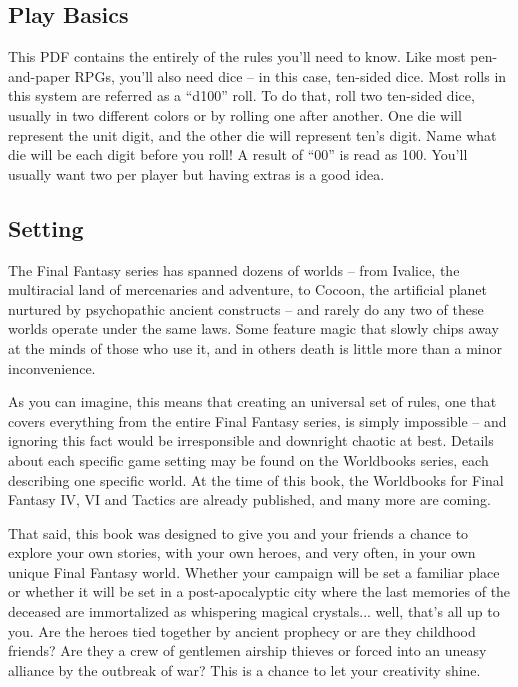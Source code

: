\begin{multicols}{2}

\section{Play Basics}
This PDF contains the entirely of the rules
you'll need to know. Like most pen-and-paper
RPGs, you'll also need dice – in this case, ten-sided
dice. Most rolls in this system are referred as a
“d100” roll. To do that, roll two ten-sided dice,
usually in two different colors or by rolling one
after another. One die will represent the unit digit,
and the other die will represent ten's digit. Name
what die will be each digit before you roll! A result
of “00” is read as 100. You’ll usually want two per
player but having extras is a good idea.

\subsection{Setting}
The Final Fantasy series has spanned
dozens of worlds – from Ivalice, the multiracial
land of mercenaries and adventure, to Cocoon, the
artificial planet nurtured by psychopathic ancient
constructs – and rarely do any two of these worlds
operate under the same laws. Some feature magic
that slowly chips away at the minds of those who
use it, and in others death is little more than a
minor inconvenience.

As you can imagine, this means that creating
an universal set of rules, one that covers
everything from the entire Final Fantasy series, is
simply impossible – and ignoring this fact would
be irresponsible and downright chaotic at best.
Details about each specific game setting may be
found on the Worldbooks series, each describing
one specific world. At the time of this book, the
Worldbooks for Final Fantasy IV, VI and Tactics are
already published, and many more are coming.

That said, this book was designed to give you
and your friends a chance to explore your own
stories, with your own heroes, and very often, in
your own unique Final Fantasy world. Whether
your campaign will be set a familiar place or
whether it will be set in a post-apocalyptic city
where the last memories of the deceased are
immortalized as whispering magical crystals...
well, that’s all up to you. Are the heroes tied
together by ancient prophecy or are they
childhood friends? Are they a crew of gentlemen
airship thieves or forced into an uneasy alliance by
the outbreak of war? This is a chance to let your
creativity shine.


\end{multicols}

